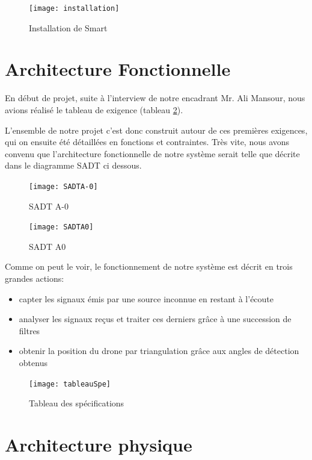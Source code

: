 \begin{figure}[!h]
  \centering
  \texttt{[image: installation]}
  \caption{Installation de Smart}
  \label{fig:inst}
\end{figure}


\section{Architecture Fonctionnelle}
En début de projet, suite à l'interview de notre encadrant Mr. Ali Mansour, nous avions réalisé le tableau de exigence (tableau \ref{pdf:tab}).


L'ensemble de notre projet c'est donc construit autour de ces premières exigences, qui on ensuite été détaillées en fonctions et contraintes. Très vite, nous avons convenu que l'architecture fonctionnelle de notre système serait telle que décrite dans le diagramme SADT ci dessous.

\begin{figure}[h]
  \begin{minipage}{0.45\linewidth}
    \centering
    \texttt{[image: SADTA-0]}
    \caption{SADT A-0}
  \end{minipage}\hfill
  \begin{minipage}{0.45\linewidth}
    \centering
    \texttt{[image: SADTA0]}
    \caption{SADT A0}
  \end{minipage}
\end{figure}




Comme on peut le voir, le fonctionnement de notre système est décrit en trois grandes actions: 
\begin{itemize}
\item capter les signaux émis par une source inconnue en restant à l'écoute
\item analyser les signaux reçus et traiter ces derniers grâce à une succession de filtres
\item obtenir la position du drone par triangulation grâce aux angles de détection obtenus
\end{itemize}


\begin{figure}[h]
  \centering
  \texttt{[image: tableauSpe]}
  \caption{Tableau des spécifications}
  \label{pdf:tab}
\end{figure}

 

\newpage


\section{Architecture physique}
\label{sec:phys}

